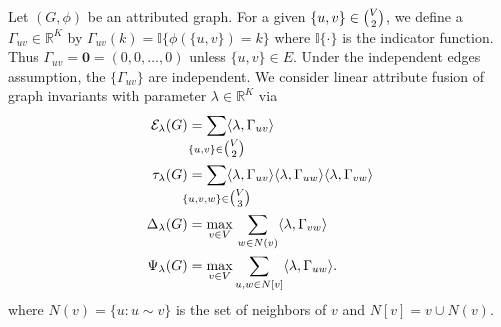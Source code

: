 \documentclass[10pt,draftclsnofoot,onecolumn]{IEEEtran}
\theoremstyle{definition}
\def\clap#1{\hbox to 0pt{\hss#1\hss}}
\def\mathclap{\mathpalette\mathclapinternal}
\def\mathclapinternal#1#2{%
\clap{$\mathsurround=0pt#1{#2}$}%
}
\begin{document}
Let $(G,\phi)$ be an attributed graph. For a given $\{u,v\} \in
\tbinom{V}{2}$, we define a $\Gamma_{uv} \in \mathbb{R}^{K}$ by
$\Gamma_{uv}(k) = \mathbb{I}\{\phi(\{u,v\}) = k\}$ where $\mathbb{I}\{
\cdot \}$ is the indicator function. Thus $\Gamma_{uv} = \bm{0} =
(0,0,\dots,0)$ unless $\{u,v\} \in E$. Under the independent edges
assumption, the $\{\Gamma_{uv}\}$ are independent. We consider linear
attribute fusion of graph invariants with parameter $\lambda \in
\mathbb{R}^{K}$ via
\begin{align}
  \label{eq:6}
  \mathcal{E}_{\lambda}(G) &= \sum_{\mathclap{\{u,v\} \in
      \tbinom{V}{2}}} \langle
  \lambda, \Gamma_{uv} \rangle \\
  \tau_{\lambda}(G) &= \sum_{\mathclap{\{u,v,w\} \in \tbinom{V}{3}}} \langle
  \lambda, \Gamma_{uv} \rangle \langle \lambda,
  \Gamma_{uw} \rangle \langle \lambda, \Gamma_{vw}
  \rangle \\ 
\Delta_{\lambda}(G) &= \max_{v \in V} \, \sum_{w \in N(v)} \langle
\lambda, \Gamma_{vw} \rangle \\
\label{eq:3}
  \Psi_{\lambda}(G) &= \max_{v \in V} \sum_{u,w \in N[v]} \langle
  \lambda, \Gamma_{uw} \rangle.
  \end{align}
  where $N(v) = \{u \colon u \sim v\}$ is the set of neighbors of
  $v$ and $N[v] = v \cup N(v)$.  
\end{document}
